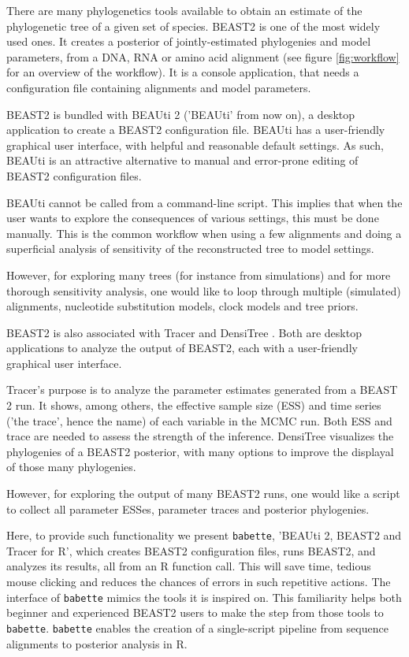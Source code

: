 \documentclass{article}
\begin{document}
There are many phylogenetics tools available to obtain an estimate 
of the phylogenetic tree of a given set of species. 
BEAST2 \cite{bouckaert2014beast} is one of the most widely used ones. 
It creates a posterior of jointly-estimated phylogenies and model parameters, 
from a DNA, RNA or amino acid alignment (see figure \ref{fig:workflow} 
for an overview of the workflow). 
It is a console application, that needs a configuration file containing 
alignments and model parameters.

BEAST2 is bundled with BEAUti 2 \cite{drummond2012bayesian} ('BEAUti' from now on), 
a desktop application to create a BEAST2 configuration file.
BEAUti has a user-friendly graphical user interface, with helpful and 
reasonable default settings.
As such, BEAUti is an attractive alternative 
to manual and error-prone editing of BEAST2 configuration files. 

BEAUti cannot be called from a command-line script.
This implies that when the user 
wants to explore the consequences of various settings, this must be done manually.
This is the common workflow when using a few alignments and doing a superficial 
analysis of sensitivity of the reconstructed tree to model settings. 

However, for exploring many trees (for instance from simulations) and for
more thorough sensitivity analysis, one would like to loop through 
multiple (simulated) alignments, nucleotide substitution models, 
clock models and tree priors. 

BEAST2 is also associated with Tracer \cite{tracer} and 
DensiTree \cite{DensiTree}. Both are desktop applications 
to analyze the output of BEAST2, each with a user-friendly graphical user interface. 

Tracer's purpose is to analyze the parameter estimates generated
from a BEAST 2 run. It shows, among
others, the effective sample size (ESS) and time series ('the trace', 
hence the name) of each variable in the MCMC run. Both ESS and trace
are needed to assess the strength of the inference. 
DensiTree visualizes the phylogenies of a BEAST2 posterior, with
many options to improve the displayal of those many phylogenies.

However, for exploring the output of many BEAST2 runs, 
one would like a script to collect all parameter ESSes,
parameter traces and posterior phylogenies. 

Here, to provide such functionality we present \verb;babette;, 
’BEAUti 2, BEAST2 and Tracer for R’, 
which creates BEAST2 configuration files,
runs BEAST2, and analyzes its results,
all from an R function call. This
will save time, tedious mouse clicking and 
reduces the chances of errors in such repetitive actions.
The interface of \verb;babette; mimics the tools it
is inspired on. This
familiarity helps both beginner and experienced BEAST2 users 
to make the step from those tools to \verb;babette;.
\verb;babette; enables the creation of a single-script 
pipeline from sequence alignments to posterior analysis in R. 
\end{document}
